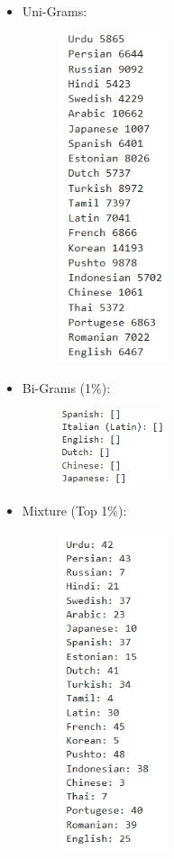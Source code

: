 \begin{itemize}
    \item Uni-Grams:
    \begin{figure}[H]
    \centering
    \includegraphics[width=0.3\textwidth]{img/docspics/Picture32.png}
\end{figure}
    \item Bi-Grams (1\%):
    \begin{figure}[H]
    \centering
    \includegraphics[width=0.3\textwidth]{img/docspics/Picture33.png}
\end{figure}
\clearpage
    \item Mixture (Top 1\%):
    \begin{figure}[H]
    \centering
    \includegraphics[width=0.3\textwidth]{img/docspics/Picture34.png}

\end{figure}
\end{itemize}
